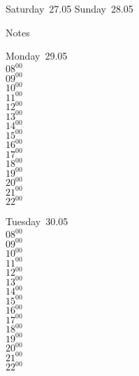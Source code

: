 \documentclass[11pt,a4paper]{book}\usepackage[]{graphicx}\usepackage[]{color}
\begin{document}
\begin{weekendbox}
  Saturday~27.05
  \tcblower
  Sunday~28.05
\end{weekendbox} %
\begin{notebox}
  Notes
\end{notebox}
\clearpage
\begin{headerbox}
\end{headerbox}
\begin{weekdaybox}
  Monday~29.05\\
  { 
  \vfill
  $08^{00}$\\
$09^{00}$\\
$10^{00}$\\
$11^{00}$\\
$12^{00}$\\
$13^{00}$\\
$14^{00}$\\
$15^{00}$\\
$16^{00}$\\
$17^{00}$\\
$18^{00}$\\
$19^{00}$\\
$20^{00}$\\
$21^{00}$\\
$22^{00}$\\
  }
\end{weekdaybox}
\begin{weekdaybox}
  Tuesday~30.05\\
  { 
  \vfill
  $08^{00}$\\
$09^{00}$\\
$10^{00}$\\
$11^{00}$\\
$12^{00}$\\
$13^{00}$\\
$14^{00}$\\
$15^{00}$\\
$16^{00}$\\
$17^{00}$\\
$18^{00}$\\
$19^{00}$\\
$20^{00}$\\
$21^{00}$\\
$22^{00}$\\
  }
\end{weekdaybox}
\end{document}
